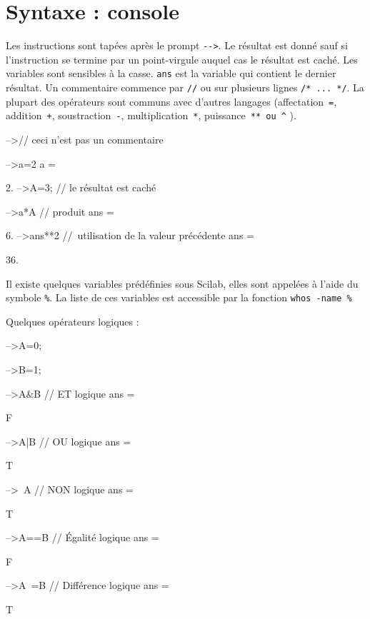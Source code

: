\section{Syntaxe : console}
Les instructions sont tapées après le prompt \verb?-->?. Le résultat est donné 
sauf si l'instruction se termine par un point-virgule auquel cas le résultat 
est caché. Les variables sont sensibles à la casse. \verb?ans? est la variable 
qui contient le dernier résultat. Un commentaire commence par  \verb?//? ou 
sur plusieurs lignes \verb?/* ... */?. La plupart des opérateurs sont 
communs avec d'autres langages (affectation~\verb?=?, addition~\verb?+?, 
soustraction~\verb?-?, multiplication~\verb?*?, puissance~\verb?** ou ^? ).
\begin{Scilabcode}
-->// ceci n'est pas un commentaire

-->a=2
 a  =
      
    2. 
-->A=3;   // le résultat est caché

-->a*A    // produit
 ans  =

    6.  
-->ans**2 // utilisation de la valeur précédente
 ans  =
  
    36.  
\end{Scilabcode}
Il existe quelques variables prédéfinies sous Scilab, elles sont appelées à 
l'aide du symbole \og\verb?%?\fg. La liste de ces variables est accessible 
par la fonction \verb?whos -name %?
\begin{Scilabcode}
\end{Scilabcode}
Quelques opérateurs logiques : 
\begin{Scilabcode}
-->A=0;

-->B=1;

-->A&B    // ET logique
 ans  =
 
  F 

-->A|B    // OU logique
 ans  =
 
  T 

-->~A     // NON logique
 ans  =
 
  T 

-->A==B   // Égalité logique
 ans  =
 
  F

-->A~=B   // Différence logique
 ans  =
 
  T
\end{Scilabcode}

